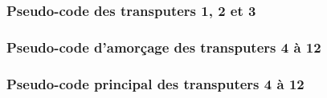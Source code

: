 \documentclass[a4paper,10pt]{article}
\begin{document}
\begin{appendices}


\subsubsection{Pseudo-code des transputers 1, 2 et 3}
\label{ann-5-decode-trans123-out}



\subsubsection{Pseudo-code d'amorçage des transputers 4 à 12}
\label{ann-5-decode-loader-out}



\subsubsection{Pseudo-code principal des transputers 4 à 12}
\label{ann-5-decode-main-out}



\end{appendices}
\end{document}
